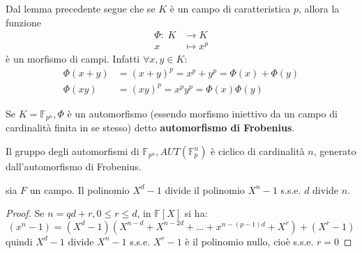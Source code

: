 \documentclass[../main.tex]{subfiles}
\begin{document}
\begin{definition}
    Dal lemma precedente segue che se $K$ è un campo di caratteristica $p$, allora la funzione
    \begin{align*}
        \Phi : \; K & \rightarrow K \\
        x           & \mapsto x^p
    \end{align*}
    è un morfismo di campi. Infatti $\forall x,y \in K$:
    \begin{align*}
        \Phi(x + y) & = (x + y)^p = x^p + y^p = \Phi(x) + \Phi(y) \\
        \Phi(xy)    & = (xy)^p = x^p y^p = \Phi(x) \Phi(y)
    \end{align*}

    Se $K = \mathbb{F}_{p^n}, \Phi$ è un automorfismo (essendo morfismo iniettivo da un campo di cardinalità finita in se stesso) detto \textbf{automorfismo di Frobenius}.
\end{definition}

\begin{theorem}
    Il gruppo degli automorfismi di $\mathbb{F}_{p^n}, AUT(\mathbb{F}_p^n)$ è ciclico di cardinalità $n$, generato dall'automorfismo di Frobenius.
\end{theorem}

\begin{lemma}
    sia $F$ un campo. Il polinomio $X^d - 1$ divide il polinomio $X^n - 1$ s.s.e. $d$ divide $n$.
\end{lemma}
\begin{proof}
    Se $n = qd + r, 0 \leq r \leq d$, in $\mathbb{F}[X]$ si ha:
    \begin{equation*}
        (x^n - 1) = (X^d - 1)(X^{n-d} + X^{n-2d} + \ldots + x^{n-(p-1)d} + X^r) + (X^r -1)
    \end{equation*}
    quindi $X^d - 1$ divide $X^n - 1$ s.s.e. $X^r - 1$ è il polinomio nullo, cioè s.s.e. $r = 0$
\end{proof}
\end{document}
